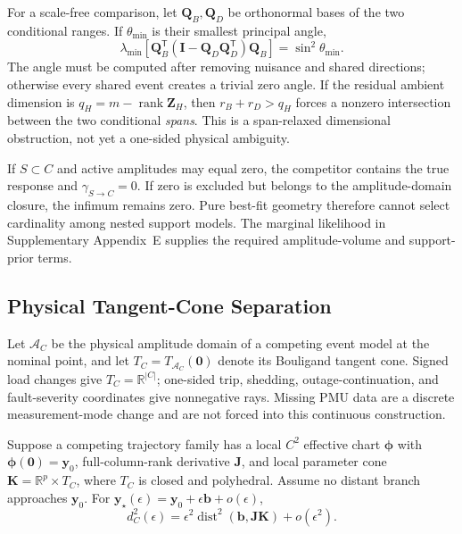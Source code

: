 For a scale-free comparison, let $\bm Q_B,\bm Q_D$ be orthonormal bases of the
two conditional ranges. If $\theta_{\min}$ is their smallest principal angle,
\begin{equation}
 \lambda_{\min}\!\left[
 \bm Q_B^{\mathsf T}(\bm I-\bm Q_D\bm Q_D^{\mathsf T})\bm Q_B
 \right]=\sin^2\theta_{\min}.
 \label{eq:supp-conditional-angle}
\end{equation}
The angle must be computed after removing nuisance and shared directions;
otherwise every shared event creates a trivial zero angle. If the residual
ambient dimension is $q_H=m-\operatorname{rank}\bm Z_H$, then
$r_B+r_D>q_H$ forces a nonzero intersection between the two conditional
\emph{spans}. This is a span-relaxed dimensional obstruction, not yet a
one-sided physical ambiguity.

If $S\subset C$ and active amplitudes may equal zero, the competitor contains the
true response and $\gamma_{S\rightarrow C}=0$. If zero is excluded but belongs
to the amplitude-domain closure, the infimum remains zero. Pure best-fit geometry
therefore cannot select cardinality among nested support models. The marginal
likelihood in Supplementary Appendix~E supplies the required amplitude-volume
and support-prior terms.

\subsection{Physical Tangent-Cone Separation}

Let $\mathcal A_C$ be the physical amplitude domain of a competing event model
at the nominal point, and let $T_C=T_{\mathcal A_C}(\bm0)$ denote its
Bouligand tangent cone. Signed load changes give $T_C=\mathbb R^{|C|}$;
one-sided trip, shedding, outage-continuation, and fault-severity coordinates
give nonnegative rays. Missing PMU data are a discrete measurement-mode change
and are not forced into this continuous construction.

\begin{theorem}
Suppose a competing trajectory family has a local $C^2$ effective chart
$\bm\phi$ with $\bm\phi(\bm0)=\bm y_0$, full-column-rank derivative
$\bm J$, and local parameter cone $\bm K=\mathbb R^p\times T_C$, where $T_C$
is closed and polyhedral. Assume no distant branch approaches $\bm y_0$.
For $\bm y_\star(\epsilon)=\bm y_0+\epsilon\bm b+o(\epsilon)$,
\begin{equation}
 d_C^2(\epsilon)
 =\epsilon^2\operatorname{dist}^2(\bm b,\bm J\bm K)
 +o(\epsilon^2).
 \label{eq:supp-cone-distance-law}
\end{equation}
\label{thm:supp-cone-separation}
\end{theorem}

